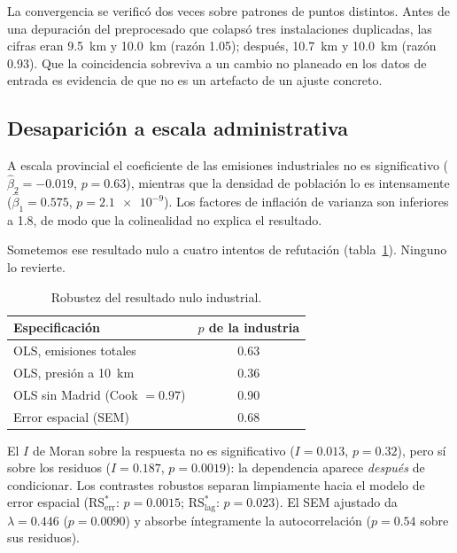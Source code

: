 \documentclass[10pt,twocolumn,a4paper]{article}
\begin{document}
La convergencia se verificó dos veces sobre patrones de puntos distintos.
Antes de una depuración del preprocesado que colapsó tres instalaciones
duplicadas, las cifras eran \SI{9.5}{\kilo\metre} y \SI{10.0}{\kilo\metre}
(razón \num{1.05}); después, \SI{10.7}{\kilo\metre} y \SI{10.0}{\kilo\metre}
(razón \num{0.93}). Que la coincidencia sobreviva a un cambio no planeado en
los datos de entrada es evidencia de que no es un artefacto de un ajuste
concreto.

\subsection{Desaparición a escala administrativa}

A escala provincial el coeficiente de las emisiones industriales no es
significativo ($\hat\beta_2 = \num{-0.019}$, $p = \num{0.63}$), mientras que
la densidad de población lo es intensamente ($\hat\beta_1 = \num{0.575}$,
$p = \num{2.1e-9}$). Los factores de inflación de varianza son inferiores a
\num{1.8}, de modo que la colinealidad no explica el resultado.

Sometemos ese resultado nulo a cuatro intentos de refutación
(tabla~\ref{tab:refutacion}). Ninguno lo revierte.

\begin{table}[t]
\centering
\caption{Robustez del resultado nulo industrial.}
\label{tab:refutacion}
\small
\begin{tabular}{@{}lc@{}}
\toprule
\textbf{Especificación} & \textbf{$p$ de la industria} \\
\midrule
OLS, emisiones totales            & \num{0.63} \\
OLS, presión a \SI{10}{\kilo\metre} & \num{0.36} \\
OLS sin Madrid (Cook $=\num{0.97}$) & \num{0.90} \\
Error espacial (SEM)              & \num{0.68} \\
\bottomrule
\end{tabular}
\end{table}

El $I$ de Moran sobre la respuesta no es significativo
($I = \num{0.013}$, $p = \num{0.32}$), pero sí sobre los residuos
($I = \num{0.187}$, $p = \num{0.0019}$): la dependencia aparece \emph{después}
de condicionar. Los contrastes robustos separan limpiamente hacia el modelo de
error espacial ($\mathrm{RS}^{*}_{\text{err}}$: $p = \num{0.0015}$;
$\mathrm{RS}^{*}_{\text{lag}}$: $p = \num{0.023}$). El SEM ajustado da
$\lambda = \num{0.446}$ ($p = \num{0.0090}$) y absorbe íntegramente la
autocorrelación ($p = \num{0.54}$ sobre sus residuos).
\end{document}
